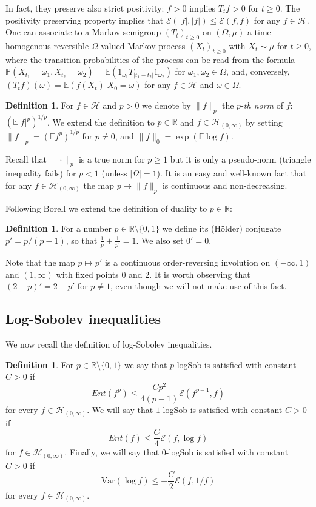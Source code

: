 \documentclass[11pt]{amsart}
\newcommand{\R}{\mathbb{R}}
\newcommand{\E}{\mathbb{E}}
\newcommand{\Var}{\mathrm{Var}}
\newcommand{\PP}{\mathbb{P}}
\newcommand{\1}{\mathbf{1}}
\def\R{{\mathbb R}}
\def\e{{\mathcal{E}}}
\def\E{{\mathbb E}}
\def\H{{\mathcal{H}}}
\theoremstyle{definition}
\newtheorem{definition}[example]{Definition}
\theoremstyle{plain}
\theoremstyle{remark}
\numberwithin{equation}{section}
\begin{document}
In fact, they preserve also strict positivity: $f>0$ implies $T_{t}f>0$ for $t \geq 0$.
The positivity preserving property implies that $\e(|f|,|f|) \leq \e(f,f)$ for any $f \in \H$.
One can associate to a Markov semigroup $(T_{t})_{t \geq 0}$ on $(\Omega, \mu)$
a time-homogenous reversible $\Omega$-valued Markov process $(X_{t})_{t \geq 0}$
with $X_{t} \sim \mu$ for $t \geq 0$, where the transition probabilities of the process can be read from the formula
$\PP(X_{t_{1}}=\omega_{1}, X_{t_{2}}=\omega_{2})=\E(1_{\omega_{1}}T_{|t_{1}-t_{2}|}1_{\omega_{2}})$
for $\omega_{1}, \omega_{2} \in \Omega$, and, conversely, $(T_t f)(\omega)=\E \left(f(X_{t})|X_{0}=\omega\right)$
for any $f \in \H$ and $\omega \in \Omega$.

\begin{definition}
For $f \in \H$ and $p>0$ we denote by $\| f\|_{p}$ the $p$-{\em th norm} of $f$: $(\E |f|^{p})^{1/p}$.
We extend the definition to $p \in \R$ and $f \in \H_{(0,\infty)}$
by setting $\| f\|_{p}=(\E f^{p})^{1/p}$ for $p \neq 0$, and $\| f\|_{0}=\exp(\E \log f)$.
\end{definition}
Recall that $\| \cdot \|_{p}$ is a true norm for $p \geq 1$  but it is only a pseudo-norm (triangle inequality fails) for $p < 1$ (unless $|\Omega|=1$).
It is an easy and well-known fact that for any $f \in \H_{(0,\infty)}$ the map $p \mapsto \| f\|_{p}$ is continuous and non-decreasing.

Following Borell \cite{Borell82} we extend the definition of duality to $p \in \R$:
\begin{definition}
For a number $p \in \R \setminus \{ 0,1\}$ we define its (H\"older) conjugate $p'=p/(p-1)$, so that $\frac{1}{p}+\frac{1}{p'}=1$. We also set $0'=0$.
\end{definition}

Note that the map $p \mapsto p'$ is a continuous order-reversing involution on $(-\infty,1)$ and $(1,\infty)$ with fixed points $0$ and $2$.
It is worth observing that $(2-p)'=2-p'$ for $p \neq 1$, even though we will not make use of this fact.

\subsection{Log-Sobolev inequalities}
We now recall the definition of log-Sobolev inequalities.

\begin{definition}
For $p \in \R \setminus \{ 0,1 \}$ we say that $p$-logSob is satisfied with constant $C>0$ if
\begin{equation}\label{def:logSob}
Ent(f^{p}) \leq \frac{Cp^{2}}{4(p-1)} \e(f^{p-1},f)
\end{equation}
for every $f \in \H_{(0,\infty)}$. We will say that $1$-logSob is satisfied with constant $C>0$ if
\[
Ent(f) \leq \frac{C}{4} \e(f,\log f)
\]
for $f \in \H_{(0,\infty)}$. Finally, we will say that
$0$-logSob is satisfied with constant $C>0$ if
\[
\Var(\log f) \leq -\frac{C}{2}\e(f,1/f)
\]
for every $f \in \H_{(0,\infty)}$.
\end{definition}
\end{document}
